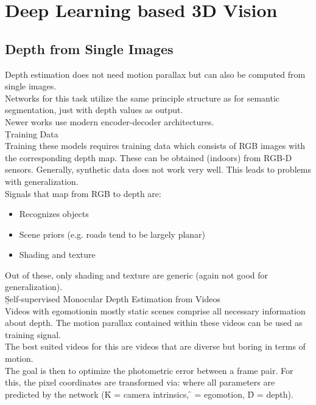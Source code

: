 \section{Deep Learning based 3D Vision}
\subsection{Depth from Single Images}
Depth estimation does not need motion parallax but can also be computed from single images.\\
Networks for this task utilize the same principle structure as for semantic segmentation, just with depth values as output.\\
Newer works use modern encoder-decoder architectures.\\

\b{Training Data\\[.5em]}
Training these models requires training data which consists of RGB images with the corresponding depth map. These can be obtained (indoors) from RGB-D sensors. Generally, synthetic data does not work very well. This leads to problems with generalization.\\

Signals that map from RGB to depth are:
\begin{itemize}
    \item Recognizes objects
    \item Scene priors (e.g. roads tend to be largely planar)
    \item Shading and texture
\end{itemize}

Out of these, only shading and texture are generic (again not good for generalization).\\

\b{Self-supervised Monocular Depth Estimation from Videos\\[.5em]}
Videos with egomotionin mostly static scenes comprise all necessary information about depth. The motion parallax contained within these videos can be used as training signal.\\
The best suited videos for this are videos that are diverse but boring in terms of motion.\\

The goal is then to optimize the photometric error between a frame pair. For this, the pixel coordinates are transformed via:
where all parameters are predicted by the network (\f{K} = camera intrinsics, \f{} = egomotion, \f{D} = depth).\\

